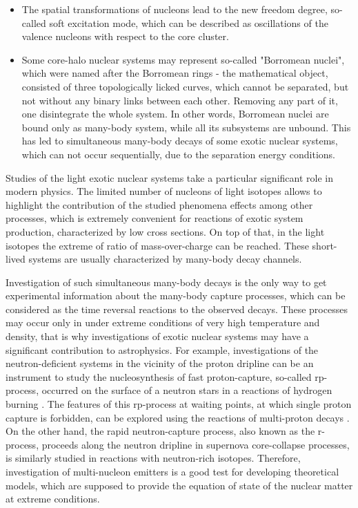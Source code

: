 \begin{itemize}
	\item 
	The spatial transformations of nucleons lead to the new freedom degree, so-called soft excitation mode, which can be described as oscillations of the valence nucleons with respect to the core cluster. 
	
	\item 
	Some core-halo nuclear systems may represent so-called "Borromean nuclei", which were named after the Borromean rings - the mathematical object, consisted of three topologically licked curves, which cannot be separated, but not without any binary links between each other.
	Removing any part of it, one disintegrate the whole system.
	In other words, Borromean nuclei are bound only as many-body system, while all its subsystems are unbound.
	This has led to simultaneous many-body decays of some exotic nuclear systems, which can not occur sequentially, due to the separation energy conditions.
	

\end{itemize}



Studies of the light exotic nuclear systems take a particular significant role in modern physics.
The limited number of nucleons of light isotopes allows to highlight the contribution of the studied phenomena effects among other processes, which is extremely convenient for reactions of exotic system production, characterized by low cross sections.
On top of that, in the light isotopes the extreme of ratio of mass-over-charge can be reached.
These short-lived systems are usually characterized by many-body decay channels.

Investigation of such simultaneous many-body decays is the only way to get experimental information about the many-body capture processes, which can be considered as the time reversal reactions to the observed decays.
These processes may occur only in under extreme conditions of very high temperature and density, that is why investigations of exotic nuclear systems may have a significant contribution to astrophysics.
For example, investigations of the neutron-deficient systems in the vicinity of the proton dripline can be an instrument to study the nucleosynthesis of fast proton-capture, so-called rp-process, occurred on the surface of a neutron stars in a reactions of hydrogen burning \cite{GrigorenkoUFN:2019,Grigorenko:2009b,Grigorenko:2006,Grigorenko:2005a,Schatz:1998}. 
The features of this rp-process at waiting points, at which single proton capture is forbidden, can be explored using the reactions of multi-proton decays \cite{Gorres:1995}.
On the other hand, the rapid neutron-capture process, also known as the r-process, proceeds along the neutron dripline in supernova core-collapse processes, is similarly studied in reactions with neutron-rich isotopes.
Therefore, investigation of multi-nucleon emitters is a good test for developing theoretical models, which are supposed to provide the equation of state of the nuclear matter at extreme conditions. 

